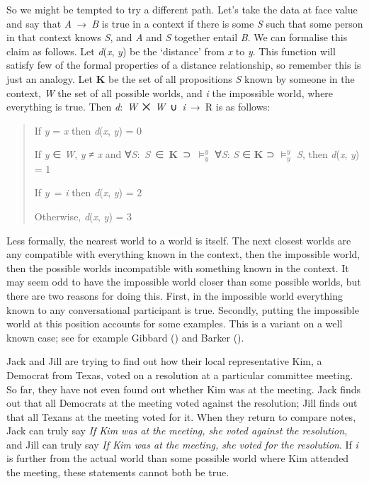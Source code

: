 \documentclass[
  11pt,
  letterpaper,
  DIV=11,
  numbers=noendperiod,
  twoside]{scrartcl}
\begin{document}
So we might be tempted to try a different path. Let's take the data at
face value and say that \emph{A}~→~\emph{B} is true in a context if
there is some \emph{S} such that some person in that context knows
\emph{S}, and \emph{A} and \emph{S} together entail \emph{B}. We can
formalise this claim as follows. Let \emph{d}(\emph{x}, \emph{y}) be the
`distance' from \emph{x} to \emph{y}. This function will satisfy few of
the formal properties of a distance relationship, so remember this is
just an analogy. Let \textbf{K} be the set of all propositions \emph{S}
known by someone in the context, \emph{W} the set of all possible
worlds, and \emph{i} the impossible world, where everything is true.
Then \emph{d}:~\emph{W}~⨉~\emph{W}~∪~\emph{i}~→~R is as follows:

\begin{quote}
If \emph{y} = \emph{x} then \emph{d}(\emph{x}, \emph{y}) = 0

If \emph{y} ∈ \emph{W}, \emph{y} ≠ \emph{x} and
∀\emph{S}:~\emph{S}~∈~\textbf{K}~⊃~\(\vDash_y^y\) ∀\emph{S}: \emph{S} ∈
\textbf{K} ⊃ \(\vDash_y^y\) \emph{S}, then \emph{d}(\emph{x}, \emph{y})
= 1

If \emph{y}~= \emph{i} then \emph{d}(\emph{x}, \emph{y}) = 2

Otherwise, \emph{d}(\emph{x}, \emph{y}) = 3
\end{quote}

Less formally, the nearest world to a world is itself. The next closest
worlds are any compatible with everything known in the context, then the
impossible world, then the possible worlds incompatible with something
known in the context. It may seem odd to have the impossible world
closer than some possible worlds, but there are two reasons for doing
this. First, in the impossible world everything known to any
conversational participant is true. Secondly, putting the impossible
world at this position accounts for some examples. This is a variant on
a well known case; see for example Gibbard
() and Barker
().

Jack and Jill are trying to find out how their local representative Kim,
a Democrat from Texas, voted on a resolution at a particular committee
meeting. So far, they have not even found out whether Kim was at the
meeting. Jack finds out that all Democrats at the meeting voted against
the resolution; Jill finds out that all Texans at the meeting voted for
it. When they return to compare notes, Jack can truly say \emph{If Kim
was at the meeting, she voted against the resolution}, and Jill can
truly say \emph{If Kim was at the meeting, she voted for the
resolution}. If \emph{i} is further from the actual world than some
possible world where Kim attended the meeting, these statements cannot
both be true.
\end{document}
